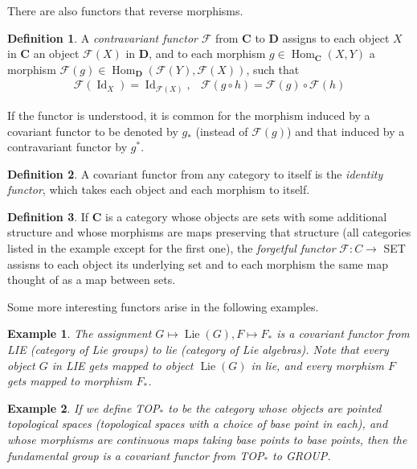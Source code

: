 \documentclass{article}
\DeclareMathOperator{\Id}{Id}
\DeclareMathOperator{\Lie}{Lie}
\DeclareMathOperator{\Hom}{Hom}
\newtheorem{example}{Example}[section]
\theoremstyle{remark}
\theoremstyle{definition}
\newtheorem{definition}{Definition}[section]
\begin{document}
There are also functors that reverse morphisms. 

\begin{definition}
A \textit{contravariant functor} $\mathcal{F}$ from $\mathbf{C}$ to $\mathbf{D}$ assigns to each object $X$ in $\mathbf{C}$ an object $\mathcal{F}(X)$ in $\mathbf{D}$, and to each morphism $g \in \Hom_\mathbf{C} (X, Y)$ a morphism $\mathcal{F}(g) \in \Hom_\mathbf{D}(\mathcal{F}(Y), \mathcal{F}(X))$, such that
\begin{align*}
    \mathcal{F}(\Id_X) = \Id_{\mathcal{F}(X)}, & \mathcal{F}(g \circ h) = \mathcal{F}(g) \circ \mathcal{F}(h)
\end{align*}
\end{definition}

If the functor is understood, it is common for the morphism induced by a covariant functor to be denoted by $g_*$ (instead of $\mathcal{F} (g)$) and that induced by a contravariant functor by $g^*$. 

\begin{definition}
A covariant functor from any category to itself is the \textit{identity functor}, which takes each object and each morphism to itself. 
\end{definition}

\begin{definition}
If $\mathbf{C}$ is a category whose objects are sets with some additional structure and whose morphisms are maps preserving that structure (all categories listed in the example except for the first one), the \textit{forgetful functor} $\mathcal{F}: C \longrightarrow $ SET assisns to each object its underlying set and to each morphism the same map thought of as a map between sets. 
\end{definition}

Some more interesting functors arise in the following examples. 

\begin{example}
The assignment $G \mapsto \Lie(G), F \mapsto F_*$ is a covariant functor from LIE (category of Lie groups) to lie (category of Lie algebras). Note that every object $G$ in LIE gets mapped to object $\Lie(G)$ in lie, and every morphism $F$ gets mapped to morphism $F_*$. 
\end{example}

\begin{example}
If we define TOP$_*$ to be the category whose objects are \textit{pointed topological spaces} (topological spaces with a choice of base point in each), and whose morphisms are continuous maps taking base points to base points, then the fundamental group is a covariant functor from TOP$_*$ to GROUP. 
\end{example}
\end{document}

